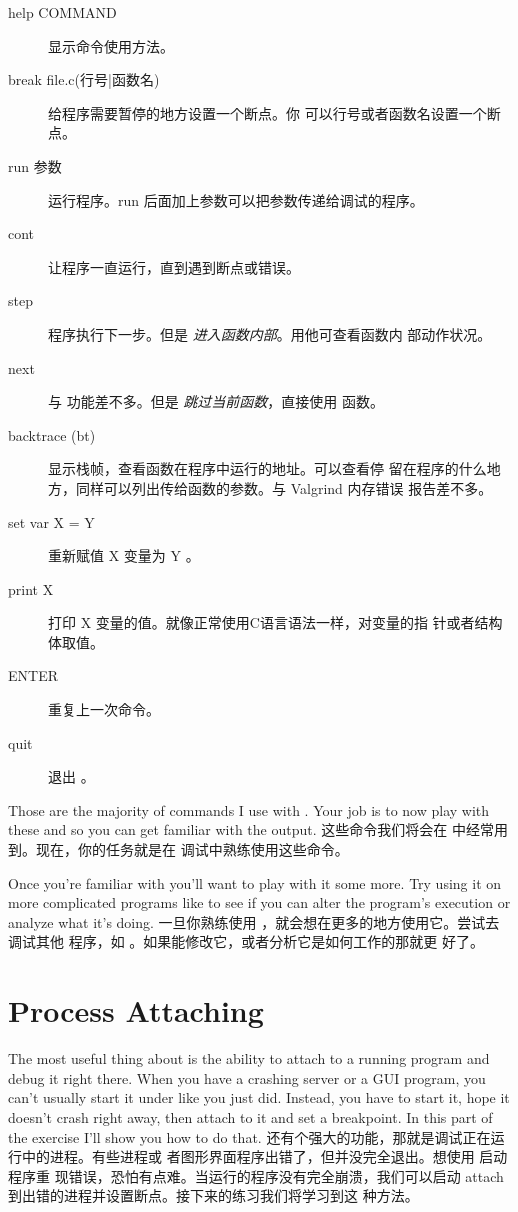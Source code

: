 \begin{enumerate}
\begin{description}
\item[help COMMAND] 显示命令使用方法。
\item[break file.c(行号|函数名)] 给程序需要暂停的地方设置一个断点。你
  可以行号或者函数名设置一个断点。
\item[run 参数] 运行程序。run 后面加上参数可以把参数传递给调试的程序。
\item[cont] 让程序一直运行，直到遇到断点或错误。
\item[step] 程序执行下一步。但是 \emph{进入函数内部}。用他可查看函数内
  部动作状况。
\item[next] 与  功能差不多。但是 \emph{跳过当前函数}，直接使用
  函数。
\item[backtrace (bt)] 显示栈帧，查看函数在程序中运行的地址。可以查看停
  留在程序的什么地方，同样可以列出传给函数的参数。与 Valgrind 内存错误
  报告差不多。
\item[set var X = Y] 重新赋值 X 变量为 Y 。
\item[print X] 打印 X 变量的值。就像正常使用C语言语法一样，对变量的指
  针或者结构体取值。
\item[ENTER] 重复上一次命令。
\item[quit] 退出 。
\end{description}




Those are the majority of commands I use with .  Your job is to
now play with these and  so you can get familiar with the output.
这些命令我们将会在  中经常用到。现在，你的任务就是在
 调试中熟练使用这些命令。

Once you're familiar with  you'll want to play with it some more.
Try using it on more complicated programs like  to see if you
can alter the program's execution or analyze what it's doing.
一旦你熟练使用 ，就会想在更多的地方使用它。尝试去调试其他
程序，如 。如果能修改它，或者分析它是如何工作的那就更
好了。

\section{Process Attaching}

The most useful thing about  is the ability to attach to a running program and
debug it right there.  When you have a crashing server or a GUI program, you can't
usually start it under  like you just did.  Instead, you have to start
it, hope it doesn't crash right away, then attach to it and set a breakpoint.  In
this part of the exercise I'll show you how to do that.
 还有个强大的功能，那就是调试正在运行中的进程。有些进程或
者图形界面程序出错了，但并没完全退出。想使用  启动程序重
现错误，恐怕有点难。当运行的程序没有完全崩溃，我们可以启动
 attach 到出错的进程并设置断点。接下来的练习我们将学习到这
种方法。


\end{enumerate}
